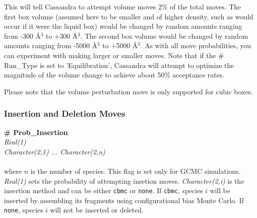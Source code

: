 %
This will tell Cassandra to attempt volume moves 2\% of the
total moves. The first box volume (assumed here to be smaller and of higher
density, such as would occur if it were the liquid box) would be
changed by random amounts ranging from 
-300 \AA $^3$ to +300 \AA $^3$. The second box volume would be
changed by random amounts ranging from
-5000 \AA $^3$ to +5000 \AA $^3$. As with all move probabilities, you
can experiment with making 
larger or smaller moves. Note that if the \# Run\_Type is set
to 'Equilibration', Cassandra will attempt to optimize the magnitude of
the volume change to achieve about 50\% acceptance rates. 

Please note that the volume perturbation move is only supported for cubic boxes. 
%                                                                                                                                           
%                





%
%
\subsubsection{Insertion and Deletion Moves}
{\bf \# Prob\_Insertion} \\
{\it Real(1)} \\
{\it Character(2,1) ... Character(2,n)} \\ \\
%
where $n$ is the number of species. 
This flag is set only for GCMC simulations. 
{\it Real(1)} sets the probability of attempting insetion moves. 
{\it Character(2,i)} is the insertion method and can be either \texttt{cbmc} or \texttt{none}. 
If \texttt{cbmc}, species $i$ will be inserted by assembling its 
fragments using configurational bias Monte Carlo.
If \texttt{none}, species $i$ will not be inserted or deleted.


